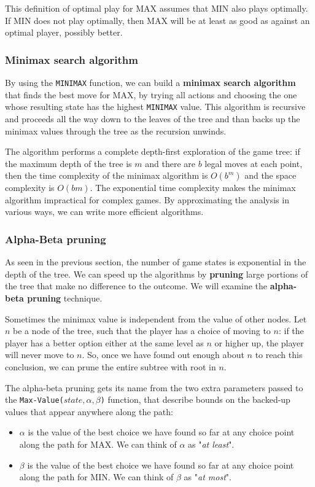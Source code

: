 \documentclass{article}
\begin{document}
This definition of optimal play for MAX assumes that MIN also plays optimally. If MIN does not play optimally, then MAX will be at least as good as against an optimal player, possibly better.

\subsubsection{Minimax search algorithm}
By using the \lstinline{MINIMAX} function, we can build a \textbf{minimax search algorithm} that finds the best move for MAX, by trying all actions and choosing the one whose resulting state has the highest \lstinline{MINIMAX} value. This algorithm is recursive and proceeds all the way down to the leaves of the tree and than backs up the minimax values through the tree as the recursion unwinds.

The algorithm performs a complete depth-first exploration of the game tree: if the maximum depth of the tree is $m$ and there are $b$ legal moves at each point, then the time complexity of the minimax algorithm is $O(b^m)$ and the space complexity is $O(bm)$. The exponential time complexity makes the minimax algorithm impractical for complex games. By approximating the analysis in various ways, we can write more efficient algorithms.

\subsubsection{Alpha-Beta pruning}
As seen in the previous section, the number of game states is exponential in the depth of the tree. We can speed up the algorithms by \textbf{pruning} large portions of the tree that make no difference to the outcome. We will examine the \textbf{alpha-beta pruning} technique.

Sometimes the minimax value is independent from the value of other nodes. Let $n$ be a node of the tree, such that the player has a choice of moving to $n$: if the player has a better option either at the same level as $n$ or higher up, the player will never move to $n$. So, once we have found out enough about $n$ to reach this conclusion, we can prune the entire subtree with root in $n$. 

The alpha-beta pruning gets its name from the two extra parameters passed to the \lstinline{Max-Value(}$state, \alpha, \beta$\lstinline{)} function, that describe bounds on the backed-up values that appear anywhere along the path:
\begin{itemize}
    \item $\alpha$ is the value of the best choice we have found so far at any choice point along the path for MAX. We can think of $\alpha$ as "\textit{at least}".
    \item $\beta$ is the value of the best choice we have found so far at any choice point along the path for MIN. We can think of $\beta$ as "\textit{at most}".
\end{itemize}
\end{document}
